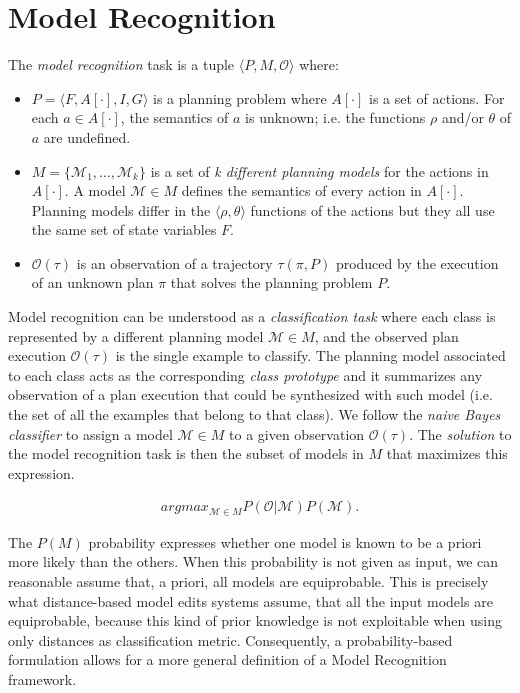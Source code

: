 \documentclass[letterpaper]{article} %
\newcommand{\tup}[1]{{\langle #1 \rangle}}
\begin{document}
\section{Model Recognition}
\label{sec:recognition}
The {\em model recognition} task is a tuple $\tup{P,M,\mathcal{O}}$ where:
\begin{itemize}
\item $P=\tup{F,A[\cdot],I,G}$ is a planning problem where $A[\cdot]$ is a set of actions. For each $a\in A[\cdot]$, the semantics of $a$ is unknown; i.e. the functions $\rho$ and/or $\theta$ of $a$ are undefined.
\item $M=\{\mathcal{M}_1,\ldots,\mathcal{M}_k\}$ is a set of {\em k different planning models} for the actions in $A[\cdot]$. A model $\mathcal{M}\in M$ defines the semantics of every action in $A[\cdot]$. Planning models differ in the $\tup{\rho,\theta}$ functions of the actions but they all use the same set of state variables $F$.
\item $\mathcal{O}(\tau)$ is an observation of a trajectory $\tau(\pi,P)$ produced by the execution of an unknown plan $\pi$ that solves the planning problem $P$.
\end{itemize}

Model recognition can be understood as a {\em classification task} where each class is represented by a different planning model $\mathcal{M}\in M$, and the observed plan execution $\mathcal{O}(\tau)$ is the single example to classify. The planning model associated to each class acts as the corresponding {\em class prototype} and it summarizes any observation of a plan execution that could be synthesized with such model (i.e. the set of all the examples that belong to that class). We follow the {\em naive Bayes classifier} to assign a model $\mathcal{M}\in M$ to a given observation $\mathcal{O}(\tau)$. The {\em solution} to the model recognition task is then the subset of models in $M$ that maximizes this expression.

\begin{align}
argmax_{\mathcal{M}\in M} P(\mathcal{O}|\mathcal{M}) P(\mathcal{M}).
\end{align}

The $P(M)$ probability expresses whether one model is known to be a priori more likely than the others. When this probability is not given as input, we can reasonable assume that, a priori, all models are equiprobable. This is precisely what distance-based model edits systems assume, that all the input models are equiprobable, because this kind of prior knowledge is not exploitable when using only distances as classification metric. Consequently, a probability-based formulation allows for a more general definition of a Model Recognition framework.
\end{document}

